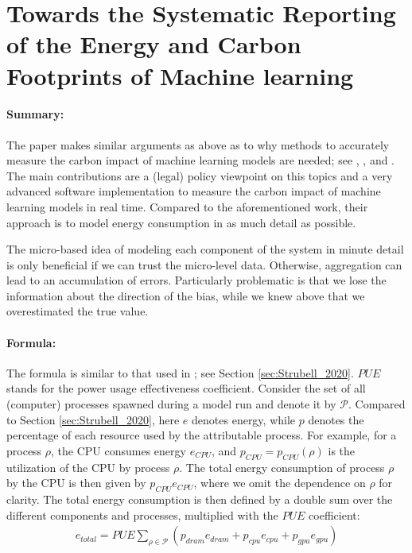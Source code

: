 \section{Towards the Systematic Reporting of the Energy and Carbon Footprints of
Machine learning}
\label{sec:Henderson_2020}
\centerline{}
\vspace{1em}

\paragraph{Summary:} The paper makes similar arguments as above as to why methods to
accurately measure the carbon impact of machine learning models are needed; see
, , and . The main
contributions are a (legal) policy viewpoint on this topics and a very advanced software
implementation to measure the carbon impact of machine learning models in real time.
Compared to the aforementioned work, their approach is to model energy consumption in as
much detail as possible.

The micro-based idea of modeling each component of the system in minute detail is only
beneficial if we can trust the micro-level data. Otherwise, aggregation can lead to an
accumulation of errors. Particularly problematic is that we lose the information about
the direction of the bias, while we knew above that we overestimated the true value.

\paragraph{Formula:} The formula is similar to that used in ; see
Section \ref{sec:Strubell_2020}. $PUE$ stands for the power usage effectiveness
coefficient. Consider the set of all (computer) processes spawned during a model run and
denote it by $\mathcal{P}$. Compared to Section \ref{sec:Strubell_2020}, here $e$
denotes energy, while $p$ denotes the percentage of each resource used by the
attributable process. For example, for a process $\rho$, the CPU consumes energy
$e_{CPU}$, and $p_{CPU} = p_{CPU}(\rho)$ is the utilization of the CPU by process
$\rho$. The total energy consumption of process $\rho$ by the CPU is then given by
$p_{CPU} e_{CPU}$, where we omit the dependence on $\rho$ for clarity. The total energy
consumption is then defined by a double sum over the different components and processes,
multiplied with the $PUE$ coefficient:
\begin{align}
    e_{total} = PUE \sum_{\rho \in \mathcal{P}} (p_{dram} e_{dram} + p_{cpu} e_{cpu} +
    p_{gpu} e_{gpu})
\end{align}

